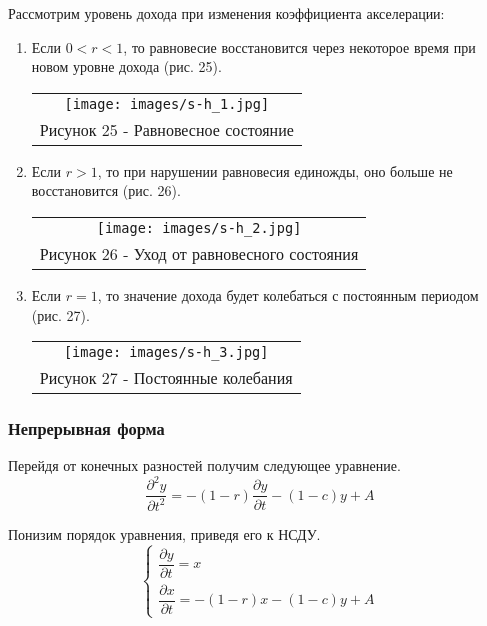 Рассмотрим уровень дохода при изменения коэффициента акселерации:
\begin{enumerate}


\item Если $0<r<1$, то равновесие восстановится через некоторое время при новом уровне дохода (рис. 25).
\begin{center}
  \begin{tabular}{c}
    \texttt{[image: images/s-h\_1.jpg]}\\
    Рисунок 25 - Равновесное состояние
  \end{tabular}
\end{center}
\item Если $r>1$, то при нарушении равновесия единожды, оно больше не восстановится (рис. 26).
\begin{center}
  \begin{tabular}{c}
    \texttt{[image: images/s-h\_2.jpg]}\\
    Рисунок 26 - Уход от равновесного состояния
  \end{tabular}
\end{center}
\item Если $r=1$, то значение дохода будет колебаться с постоянным периодом (рис. 27).
\begin{center}
  \begin{tabular}{c}
    \texttt{[image: images/s-h\_3.jpg]}\\
    Рисунок 27 - Постоянные колебания
  \end{tabular}
\end{center}
\end{enumerate}
\subsubsection{Непрерывная форма}
Перейдя от конечных разностей получим следующее уравнение.
\begin{equation}
  \dfrac{\partial^2y}{\partial t^2}=-(1-r)\dfrac{\partial y}{\partial t}-(1-c)y+A
\end{equation}

Понизим порядок уравнения, приведя его к НСДУ.
\begin{equation}
  \begin{cases}
    \dfrac{\partial y}{\partial t} = x\\
    \dfrac{\partial x}{\partial t} = -(1-r)x-(1-c)y+A
  \end{cases}
\end{equation}

